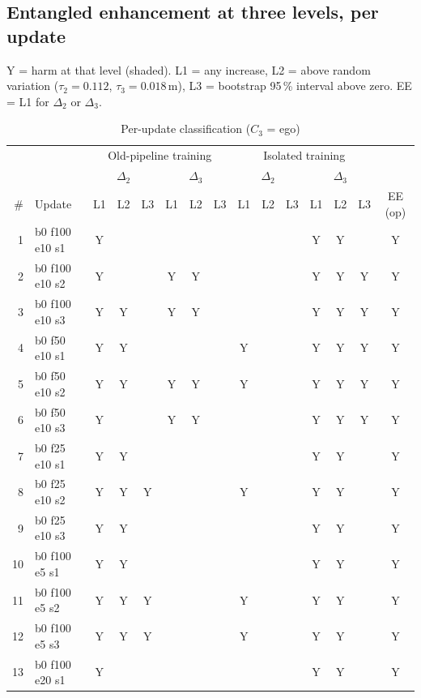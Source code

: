 \documentclass[10pt,a4paper]{article}
\newcommand{\Y}{\cellcolor{red!15}}
\begin{document}
\subsection{Entangled enhancement at three levels, per update}
Y = harm at that level (shaded). L1 = any increase, L2 = above random variation ($\tau_2 = 0.112$, $\tau_3 = 0.018$\,m), L3 = bootstrap 95\,\% interval above zero. EE = L1 for $\Delta_2$ or $\Delta_3$.
\begin{table}[h]\centering\scriptsize\caption{Per-update classification ($C_3$ = ego)}
\begin{tabular}{rl|ccc|ccc|ccc|ccc|c}\toprule
 & & \multicolumn{6}{c|}{Old-pipeline training} & \multicolumn{6}{c|}{Isolated training} & \\
 & & \multicolumn{3}{c|}{$\Delta_2$} & \multicolumn{3}{c|}{$\Delta_3$} & \multicolumn{3}{c|}{$\Delta_2$} & \multicolumn{3}{c|}{$\Delta_3$} & \\
\# & Update & L1 & L2 & L3 & L1 & L2 & L3 & L1 & L2 & L3 & L1 & L2 & L3 & EE (op)\\\midrule
1 & b0 f100 e10 s1 & \Y Y &  &  &  &  &  &  &  &  & \Y Y & \Y Y &  & Y\\
2 & b0 f100 e10 s2 & \Y Y &  &  & \Y Y & \Y Y &  &  &  &  & \Y Y & \Y Y & \Y Y & Y\\
3 & b0 f100 e10 s3 & \Y Y & \Y Y &  & \Y Y & \Y Y &  &  &  &  & \Y Y & \Y Y & \Y Y & Y\\
4 & b0 f50 e10 s1 & \Y Y & \Y Y &  &  &  &  & \Y Y &  &  & \Y Y & \Y Y & \Y Y & Y\\
5 & b0 f50 e10 s2 & \Y Y & \Y Y &  & \Y Y & \Y Y &  & \Y Y &  &  & \Y Y & \Y Y & \Y Y & Y\\
6 & b0 f50 e10 s3 & \Y Y &  &  & \Y Y & \Y Y &  &  &  &  & \Y Y & \Y Y & \Y Y & Y\\
7 & b0 f25 e10 s1 & \Y Y & \Y Y &  &  &  &  &  &  &  & \Y Y & \Y Y &  & Y\\
8 & b0 f25 e10 s2 & \Y Y & \Y Y & \Y Y &  &  &  & \Y Y &  &  & \Y Y & \Y Y &  & Y\\
9 & b0 f25 e10 s3 & \Y Y & \Y Y &  &  &  &  &  &  &  & \Y Y & \Y Y &  & Y\\
10 & b0 f100 e5 s1 & \Y Y & \Y Y &  &  &  &  &  &  &  & \Y Y & \Y Y &  & Y\\
11 & b0 f100 e5 s2 & \Y Y & \Y Y & \Y Y &  &  &  & \Y Y &  &  & \Y Y & \Y Y &  & Y\\
12 & b0 f100 e5 s3 & \Y Y & \Y Y & \Y Y &  &  &  & \Y Y &  &  & \Y Y & \Y Y &  & Y\\
13 & b0 f100 e20 s1 & \Y Y &  &  &  &  &  &  &  &  & \Y Y & \Y Y &  & Y\\

\end{tabular}
\end{table}
\end{document}
